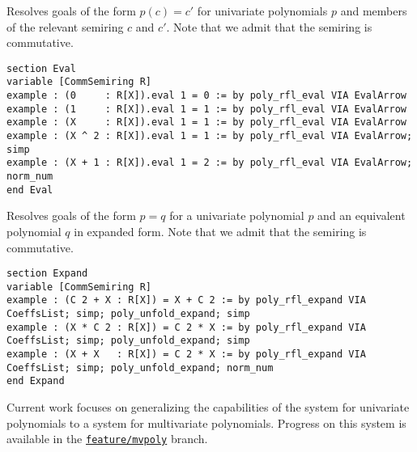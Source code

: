 \begin{tactic}
\label{tac:poly_rfl_eval}
\leanok
{}
Resolves goals of the form $p(c) = c'$ for univariate polynomials $p$ and members of the relevant semiring $c$ and $c'$. Note that we admit that the semiring is commutative.
\begin{lstlisting}
section Eval
variable [CommSemiring R]
example : (0     : R[X]).eval 1 = 0 := by poly_rfl_eval VIA EvalArrow
example : (1     : R[X]).eval 1 = 1 := by poly_rfl_eval VIA EvalArrow
example : (X     : R[X]).eval 1 = 1 := by poly_rfl_eval VIA EvalArrow
example : (X ^ 2 : R[X]).eval 1 = 1 := by poly_rfl_eval VIA EvalArrow; simp
example : (X + 1 : R[X]).eval 1 = 2 := by poly_rfl_eval VIA EvalArrow; norm_num
end Eval
\end{lstlisting}
\end{tactic}

\begin{tactic}
\label{tac:poly_rfl_expand}
\leanok
{}
Resolves goals of the form $p = q$ for a univariate polynomial $p$ and an equivalent polynomial $q$ in expanded form. Note that we admit that the semiring is commutative.
\begin{lstlisting}
section Expand
variable [CommSemiring R]
example : (C 2 + X : R[X]) = X + C 2 := by poly_rfl_expand VIA CoeffsList; simp; poly_unfold_expand; simp
example : (X * C 2 : R[X]) = C 2 * X := by poly_rfl_expand VIA CoeffsList; simp; poly_unfold_expand; simp
example : (X + X   : R[X]) = C 2 * X := by poly_rfl_expand VIA CoeffsList; simp; poly_unfold_expand; norm_num
end Expand
\end{lstlisting}
\end{tactic}

\label{sec:multivariate}

Current work focuses on generalizing the capabilities of the system for univariate polynomials to a system for multivariate polynomials. Progress on this system is available in the \href{https://github.com/LiamSchilling/AutomatePolynomial/tree/feature/mvpoly}{\texttt{feature/mvpoly}} branch.

\newpage

